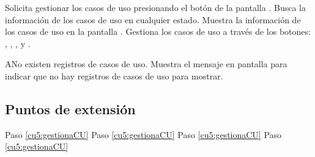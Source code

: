  \begin{UCtrayectoria}
    \UCpaso[\UCactor] Solicita gestionar los casos de uso presionando el botón \btnCU de la pantalla .
    \UCpaso[\UCsist] Busca la información de los casos de uso en cualquier estado. 
    \UCpaso[\UCsist] Muestra la información de los casos de uso en la pantalla . 
    \UCpaso[\UCactor] Gestiona los casos de uso a través de los botones: \btnRevisar, \btnNuevo, \btnConsulta, \btnEditar y \btnEliminar. \label{cu5:gestionaCU}
 \end{UCtrayectoria}
 
 \begin{UCtrayectoriaA}{A}{No existen registros de casos de uso.}
    \UCpaso[\UCsist] Muestra el mensaje  en pantalla  
    para indicar que no hay registros de casos de uso para mostrar.
 \end{UCtrayectoriaA}
 

\subsection{Puntos de extensión}

	{Paso \ref{cu5:gestionaCU}}
	{}
	{Paso \ref{cu5:gestionaCU}}
	{}	
	{Paso \ref{cu5:gestionaCU}}
	{}
	{Paso \ref{cu5:gestionaCU}}
	{}
  